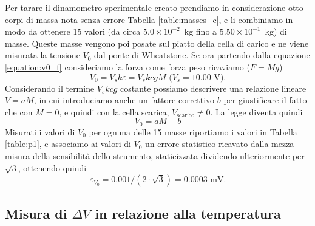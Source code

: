 \documentclass[italian, a4paper, 10pt, twocolumn]{../../style/lab_unige}
\newcommand{\reftab}[1]{Tabella {\ref{#1}}}%
\newcommand{\mstdErr}[1]{\varepsilon_{#1}}
\begin{document}
    Per tarare il dinamometro sperimentale creato prendiamo in considerazione otto corpi di massa nota senza errore \reftab{table:masses_c}, e li combiniamo in modo da ottenere 15 valori (da circa $5.0\times10^{-2}$~kg fino a $5.50\times10^{-1}$~kg) di masse. Queste masse vengono poi posate sul piatto della cella di carico e ne viene misurata la tensione $V_0$ dal ponte di Wheatstone. 
    Se ora partendo dalla equazione \ref{equation:v0_f} consideriamo la forza come forza peso ricaviamo ($F=Mg$)
    \begin{equation}
        V_0=V_sk\varepsilon=V_skcgM\text{ ($V_s=10.00$~V).}\label{eqation:v0_mg}
    \end{equation}
    Considerando il termine $V_skcg$ costante possiamo descrivere una relazione lineare $V=aM$, in cui introduciamo anche un fattore correttivo $b$ per giustificare il fatto che con $M=0$, e quindi con la cella scarica, $V_{\text{scarico}}\neq0$. La legge diventa quindi
    \begin{equation}
        V_0=aM+b
    \end{equation}
    Misurati i valori di $V_0$ per ognuna delle 15 masse riportiamo i valori in \reftab{table:p1}, e associamo ai valori di $V_0$ un errore statistico ricavato dalla mezza misura della sensibilità dello strumento, staticizzata dividendo ulteriormente per $\sqrt{3}$, ottenendo quindi \[\mstdErr{V_0} = 0.001/(2\cdot\sqrt{3})=0.0003\text{ mV.}\]

    

    \subsection{Misura di $\Delta V$ in relazione alla temperatura}
\end{document}
